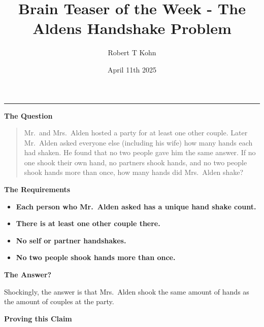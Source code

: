 \documentclass{article}
\title{\textbf{Brain Teaser of the Week - The Aldens Handshake Problem}}
\author{Robert T Kohn}
\date{April 11th  2025}
\begin{document}
\maketitle

\begin{center}
\vspace{-3.033em}
\noindent\rule{0.7\linewidth}{0.5pt}

\textbf{\large The Question}
\end{center}
\begin{quotation}
Mr.\ and Mrs.\ Alden hosted a party for at least one other couple.  Later
Mr.\ Alden asked everyone else (including his wife) how many hands each had shaken. He found that
no two people gave him the same answer. If no one shook their own hand, no partners shook hands, and no two
people shook hands more than once, how many hands did Mrs.\ Alden shake?
\end{quotation}


\begin{center}
\textbf{\large The Requirements}
\end{center}
\begin{itemize}
    \item \textbf{Each person who Mr.\ Alden asked has a unique hand shake count.} 
\item \textbf{There is at least one other couple there.} 
    \item \textbf{No self or partner handshakes.} 
\item \textbf{No two people shook hands more than once.} 
\end{itemize}

\begin{center}
\textbf{\large The Answer?}

Shockingly, the answer is that Mrs.\ Alden shook the same amount of hands as the amount of couples at the party.
\end{center}

\begin{center}
\textbf{\large Proving this Claim}
\end{center}
\vspace{-3.033em}
\end{document}
